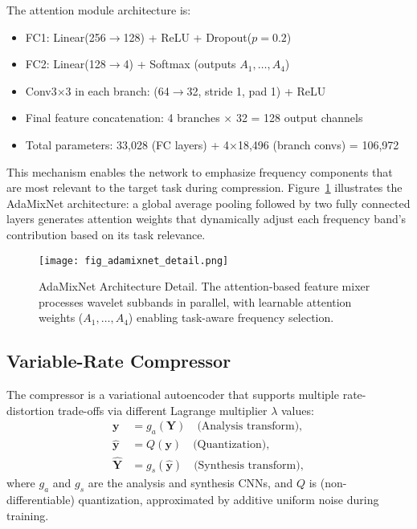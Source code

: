 \documentclass[conference]{IEEEtran}
\begin{document}
The attention module architecture is:
\begin{itemize}
\item FC1: Linear(256$\to$128) + ReLU + Dropout($p=0.2$)
\item FC2: Linear(128$\to$4) + Softmax (outputs $A_1,\dots,A_4$)
\item Conv3$\times$3 in each branch: (64$\to$32, stride 1, pad 1) + ReLU
\item Final feature concatenation: 4 branches $\times$ 32 = 128 output channels
\item Total parameters: 33,028 (FC layers) + 4$\times$18,496 (branch convs) = 106,972
\end{itemize}

This mechanism enables the network to emphasize frequency components that are most relevant to the target task during compression. Figure~\ref{fig:adamixnet_detail} illustrates the AdaMixNet architecture: a global average pooling followed by two fully connected layers generates attention weights that dynamically adjust each frequency band's contribution based on its task relevance.

\begin{figure}[htbp]
\centering
\texttt{[image: fig\_adamixnet\_detail.png]}
\caption{AdaMixNet Architecture Detail. The attention-based feature mixer processes wavelet subbands in parallel, with learnable attention weights ($A_1,\dots,A_4$) enabling task-aware frequency selection.}
\label{fig:adamixnet_detail}
\end{figure}

\subsection{Variable-Rate Compressor}

The compressor is a variational autoencoder that supports multiple rate-distortion trade-offs via different Lagrange multiplier $\lambda$ values:
\begin{align}
\mathbf{y} &= g_a(\mathbf{Y}) \quad \text{(Analysis transform)}, \\
\hat{\mathbf{y}} &= Q(\mathbf{y}) \quad \text{(Quantization)}, \\
\hat{\mathbf{Y}} &= g_s(\hat{\mathbf{y}}) \quad \text{(Synthesis transform)},
\end{align}
where $g_a$ and $g_s$ are the analysis and synthesis CNNs, and $Q$ is (non-differentiable) quantization, approximated by additive uniform noise during training.
\end{document}
